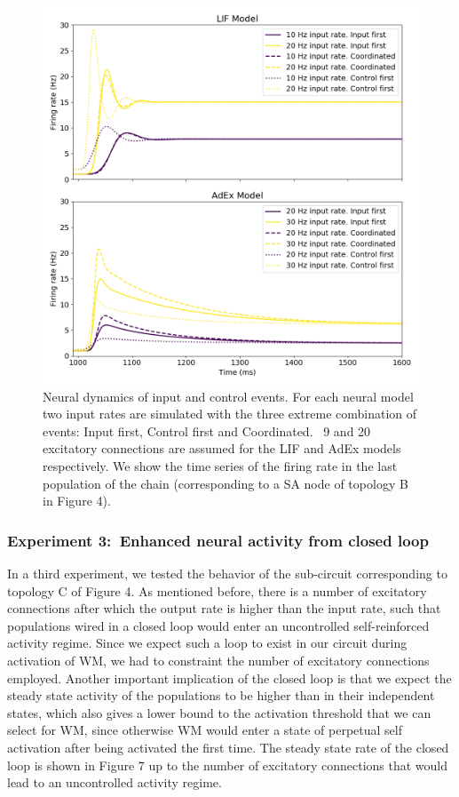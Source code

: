 \documentclass[10pt]{article}
\begin{document}
\begin{figure}[h!]
  \begin{center}
    \includegraphics[width=0.70\columnwidth]{figures/experiment2_ctl_plots/experiment2_ctl_plots}

    \caption{Neural dynamics of input and control events.
For each
      neural model two input rates are simulated with the three
      extreme combination of events: Input first, Control first and
      Coordinated.
~9 and 20 excitatory connections are assumed for
      the LIF and AdEx models respectively.
We show the time series of
      the firing rate in the last population of the chain
      (corresponding to a SA node of topology B in Figure 4).
}
    \label{462003}
  \end{center}
\end{figure}

\subsubsection{Experiment 3:~Enhanced neural activity from closed
  loop}

{\label{758539}}

In a third experiment, we tested the behavior of the sub-circuit corresponding to topology C of Figure 4.
As mentioned before, there is a number of excitatory connections after which the output rate is higher than the input rate, such that populations wired in a closed loop would enter an uncontrolled self-reinforced activity regime.
Since we expect such a loop to exist in our circuit during activation of WM, we had to constraint the number of excitatory connections employed.
Another important implication of the closed loop is that we expect the steady state activity of the populations to be higher than in their independent states, which also gives a lower bound to the activation threshold that we can select for WM, since otherwise WM would enter a state of perpetual self activation after being activated the first time.
The steady state rate of the closed loop is shown in Figure 7 up to the number of excitatory connections that would lead to an uncontrolled activity regime.
\end{document}
